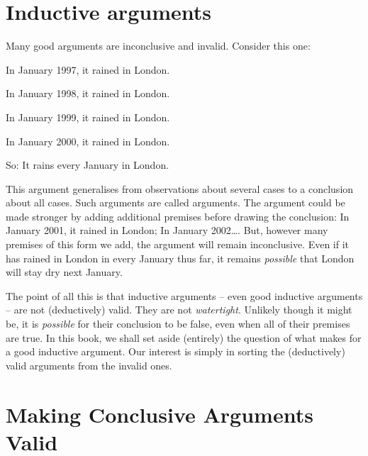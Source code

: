 \section{Inductive arguments}
Many good arguments are inconclusive and invalid. Consider this one:
	\begin{earg}
		\item[] In January 1997, it rained in London.
		\item[] In January 1998, it rained in London.
		\item[] In January 1999, it rained in London.
		\item[] In January 2000, it rained in London.
	\item[So:] It rains every January in London.
\end{earg}
This argument generalises from observations about several cases to a conclusion about all cases. Such arguments are called  arguments. The argument could be made stronger by adding additional premises before drawing the conclusion: In January 2001, it rained in London; In January 2002\ldots. But, however many premises of this form we add, the argument will remain inconclusive. Even if it has rained in London in every January thus far, it remains \emph{possible} that London will stay dry next January.

The point of all this is that inductive arguments – even good inductive arguments – are not (deductively) valid. They are not \emph{watertight}. Unlikely though it might be, it is \emph{possible} for their conclusion to be false, even when all of their premises are true. In this book, we shall set aside (entirely) the question of what makes for a good inductive argument. Our interest is simply in sorting the (deductively) valid arguments from the invalid ones.



\section{Making Conclusive Arguments Valid} %

